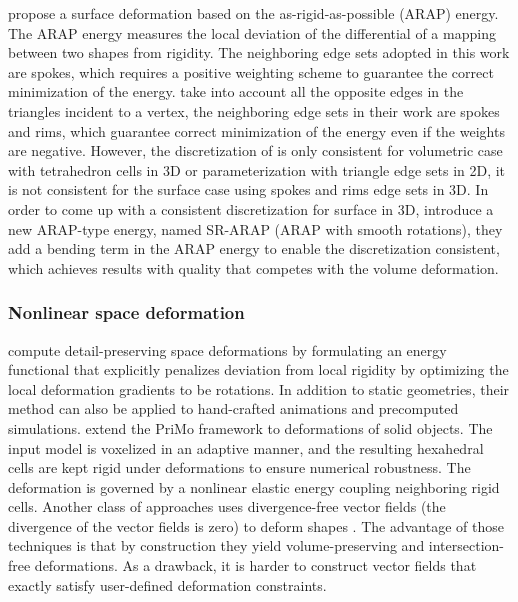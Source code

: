\cite{sorkine2007rigid} propose a surface deformation based on the as-rigid-as-possible (ARAP) energy. The ARAP energy measures the local deviation of the differential of a mapping between two shapes from rigidity. The neighboring edge sets adopted in this work are spokes, which requires a positive weighting scheme to guarantee the correct minimization of the energy. \cite{chao2010simple} take into account all the opposite edges in the triangles incident to a vertex, the neighboring edge sets in their work are spokes and rims, which guarantee correct minimization of the energy even if the weights are negative. However, the discretization of \citep{chao2010simple} is only consistent for volumetric case with tetrahedron cells in 3D or parameterization with triangle edge sets in 2D, it is not consistent for the surface case using spokes and rims edge sets in 3D. In order to come up with a consistent discretization for surface in 3D, \cite{levi2015smooth} introduce a new ARAP-type energy, named SR-ARAP (ARAP with smooth rotations), they add a bending term in the ARAP energy to enable the discretization consistent, which achieves results with quality that competes with the volume deformation.

\subsubsection{Nonlinear space deformation}
\cite{sumner2007embedded} compute detail-preserving space deformations by formulating an energy functional that explicitly penalizes deviation from local rigidity by optimizing the local deformation gradients to be rotations. In addition to static geometries, their method can also be applied to hand-crafted animations and precomputed simulations. \cite{botsch2007adaptive} extend the PriMo framework \citep{botsch2006primo} to deformations of solid objects. The input model is voxelized in an adaptive manner, and the resulting hexahedral cells are kept rigid under deformations to ensure numerical robustness. The deformation is governed by a nonlinear elastic energy coupling neighboring rigid cells. Another class of approaches uses divergence-free vector fields (the divergence of the vector fields is zero) to deform shapes \citep{angelidis2006swirling,von2006vector}. The advantage of those techniques is that by construction they yield volume-preserving and intersection-free deformations. As a drawback, it is harder to construct vector fields that exactly satisfy user-defined deformation constraints.

